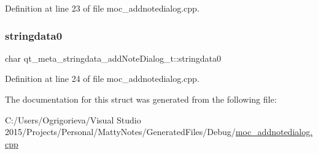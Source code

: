 Definition at line 23 of file moc\+\_\+addnotedialog.\+cpp.

\hypertarget{structqt__meta__stringdata__addNoteDialog__t_aa36bd0528981067f754981fb90d385d8}{}\label{structqt__meta__stringdata__addNoteDialog__t_aa36bd0528981067f754981fb90d385d8} 
\subsubsection{\texorpdfstring{stringdata0}{stringdata0}}
{\footnotesize\ttfamily char qt\+\_\+meta\+\_\+stringdata\+\_\+add\+Note\+Dialog\+\_\+t\+::stringdata0}



Definition at line 24 of file moc\+\_\+addnotedialog.\+cpp.



The documentation for this struct was generated from the following file\+:\begin{DoxyCompactItemize}
\item 
C\+:/\+Users/\+Ogrigorieva/\+Visual Studio 2015/\+Projects/\+Personal/\+Matty\+Notes/\+Generated\+Files/\+Debug/\hyperlink{Debug_2moc__addnotedialog_8cpp}{moc\+\_\+addnotedialog.\+cpp}\end{DoxyCompactItemize}
